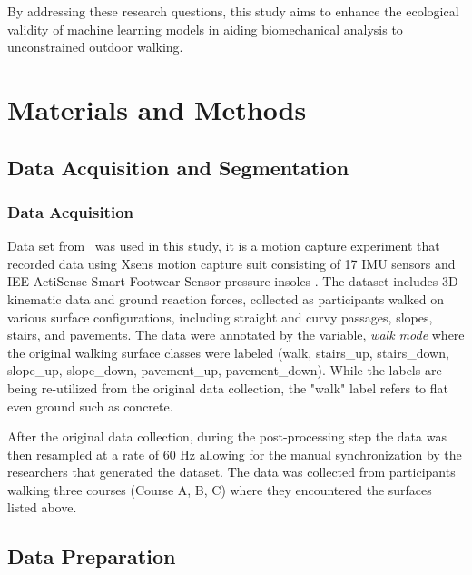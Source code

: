\documentclass[sensors,article,submit,pdftex,moreauthors]{Definitions/mdpi}
\begin{document}
By addressing these research questions, this study aims to enhance the ecological validity of machine learning models in aiding biomechanical analysis to unconstrained outdoor walking.




\section{Materials and Methods}
\label{sec:Methods}

\subsection{Data Acquisition and Segmentation}
\subsubsection{Data Acquisition}
Data set from~\cite{losing_2022} was used in this study, it is a motion capture experiment that recorded data using Xsens motion capture suit consisting of 17 IMU sensors \cite{xsens} and IEE ActiSense Smart Footwear Sensor pressure insoles \cite{foot_pressure}. The dataset includes 3D kinematic data and ground reaction forces, collected as participants walked on various surface configurations, including straight and curvy passages, slopes, stairs, and pavements. The data were annotated by the variable, \textit{walk mode} where the original walking surface classes were labeled (walk, stairs\_up, stairs\_down, slope\_up, slope\_down, pavement\_up, pavement\_down). While the labels are being re-utilized from the original data collection, the "walk" label refers to flat even ground such as concrete. 

After the original data collection, during the post-processing step the data was then resampled at a rate of 60 Hz allowing for the manual synchronization by the researchers that generated the dataset. The data was collected from participants walking three courses (Course A, B, C) where they encountered the surfaces listed above.
\subsection{Data Preparation}
\end{document}

